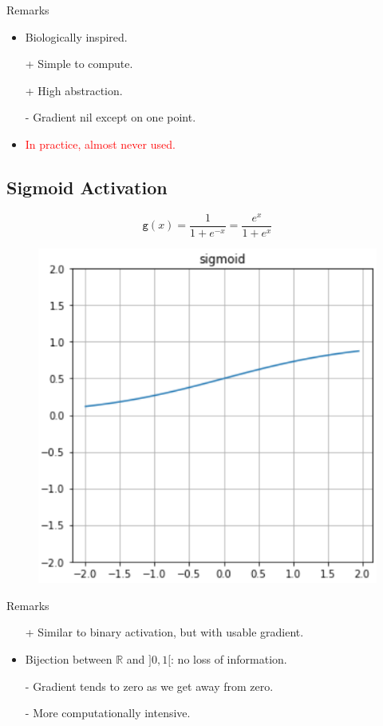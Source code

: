 \documentclass{book}
\newcommand{\act}{\texttt{g}}%
\newcommand{\R}{\mathbb{R}}
\newcommand{\alert}[1]{\textcolor{red}{#1}}
\begin{document}
\begin{myblock}{Remarks}
\begin{itemize}
\item Biologically inspired.
\item[+] Simple to compute.
\item[+] High abstraction.
\item[-] Gradient nil except on one point.
\item \alert{In practice, almost never used.}
\end{itemize}
\end{myblock}

\subsection{Sigmoid Activation}

\begin{figure}[h]
    \centering
    \begin{minipage}{.5\textwidth}
        \[
        \act(x)= \frac{1}{1 + e^{-x}} = \frac{e^{x}}{1+e^{x}}
        \]
    \end{minipage}%
    \begin{minipage}{.5\textwidth}
        \centering
        \includegraphics[width=.8\textwidth]{act_sigm.png}
    \end{minipage}
\end{figure}

\begin{myblock}{Remarks}
\begin{itemize}
\item[+] Similar to binary activation, but with usable gradient.
\item Bijection between $\R$ and $]0, 1[$: no loss of information.
\item[-] Gradient tends to zero as we get away from zero.
\item[-] More computationally intensive.
\end{itemize}
\end{myblock}
\end{document}
